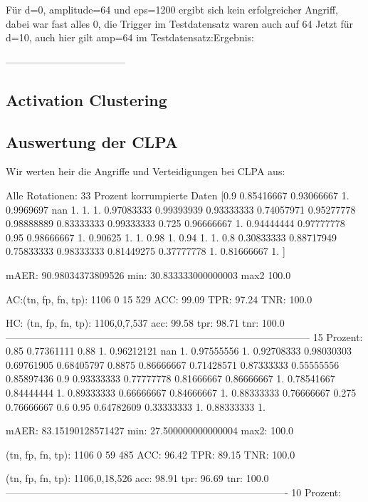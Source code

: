 \documentclass[11pt,a4paper]{article}
\numberwithin{equation}{section}
\begin{document}
	Für d=0, amplitude=64 und eps=1200 ergibt sich kein erfolgreicher Angriff, dabei war fast alles 0, die Trigger im Testdatensatz waren auch auf 64
	Jetzt für d=10, auch hier gilt amp=64 im Testdatensatz:Ergebnis:
	
	
	------------------------------------
	\subsection{Activation Clustering}
	
	\subsection{Auswertung der CLPA}
	Wir werten heir die Angriffe und Verteidigungen bei CLPA aus:
	
	Alle Rotationen: 33 Prozent korrumpierte Daten
	[0.9        0.85416667 0.93066667 1.         0.9969697         nan
	1.         1.         1.         0.97083333 0.99393939 0.93333333
	0.74057971 0.95277778 0.98888889 0.83333333 0.99333333 0.725
	0.96666667 1.         0.94444444 0.97777778 0.95       0.98666667
	1.         0.90625    1.         1.         0.98       1.
	0.94       1.         1.         0.8        0.30833333 0.88717949
	0.75833333 0.98333333 0.81449275 0.37777778 1.         0.81666667
	1. ]
	
	
	mAER:  90.98034373809526
	min:  30.833333000000003
	max2  100.0
	
	AC:(tn, fp, fn, tp):  1106 0 15 529
	ACC: 99.09
	TPR:  97.24
	TNR:  100.0
	
	HC: (tn, fp, fn, tp): 1106,0,7,537
	acc: 99.58
	tpr: 98.71
	tnr: 100.0
	--------------------------------------------------------------------------------------------
	15 Prozent:
	0.85       0.77361111 0.88       1.         0.96212121        nan
	1.         0.97555556 1.         0.92708333 0.98030303 0.69761905
	0.68405797 0.8875     0.86666667 0.71428571 0.87333333 0.55555556
	0.85897436 0.9        0.93333333 0.77777778 0.81666667 0.86666667
	1.         0.78541667 0.84444444 1.         0.89333333 0.66666667
	0.84666667 1.         0.88333333 0.76666667 0.275      0.76666667
	0.6        0.95       0.64782609 0.33333333 1.         0.88333333
	1.       
	
	mAER:  83.15190128571427
	min:  27.500000000000004
	max2:  100.0
	 
	(tn, fp, fn, tp):  1106 0 59 485
	ACC: 96.42
	TPR:  89.15
	TNR:  100.0
	
	(tn, fp, fn, tp): 1106,0,18,526
	acc: 98.91
	tpr: 96.69
	tnr: 100.0
	-------------------------------------------------------------------------------------
	10 Prozent:
	
\end{document}
